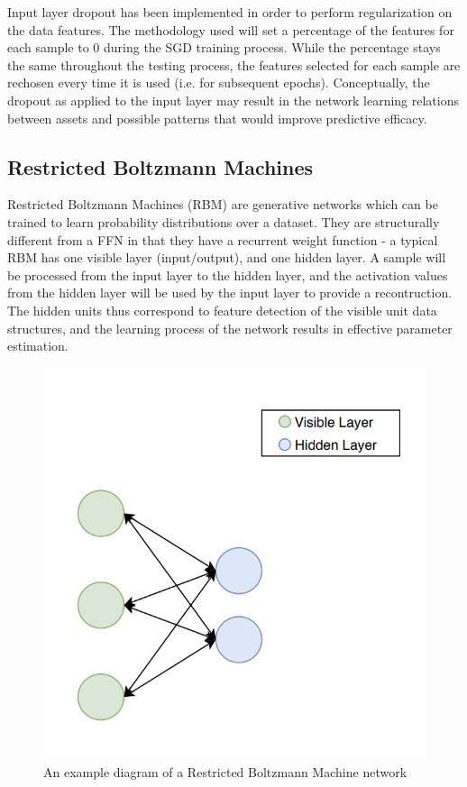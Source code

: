 \documentclass[a4paper,11pt,oneside]{article}
\theoremstyle{plain}
\theoremstyle{definition}
\begin{document}
Input layer dropout has been implemented in order to perform regularization on the data features. The methodology used will set a percentage of the features for each sample to 0 during the SGD training process. While the percentage stays the same throughout the testing process, the features selected for each sample are rechosen every time it is used (i.e. for subsequent epochs). Conceptually, the dropout as applied to the input layer may result in the network learning relations between assets and possible patterns that would improve predictive efficacy.

\subsection{Restricted Boltzmann Machines}\label{imp_rbm}

Restricted Boltzmann Machines (RBM) are generative networks which can be trained to learn probability distributions over a dataset. They are structurally different from a FFN in that they have a recurrent weight function - a typical RBM has one visible layer (input/output), and one hidden layer. A sample will be processed from the input layer to the hidden layer, and the activation values from the hidden layer will be used by the input layer to provide a recontruction. The hidden units thus correspond to feature detection of the visible unit data structures, and the learning process of the network results in effective parameter estimation. \newline

\begin{figure}[H]
	\centering 
	\includegraphics[scale=0.5]{images/implementation/rbm_network_diagram.png}
	\caption[Restricted Boltzmann Machines Diagram]{An example diagram of a Restricted Boltzmann Machine network}
	\label{figure-rbm_network_diagram}
\end{figure}		
\end{document}
